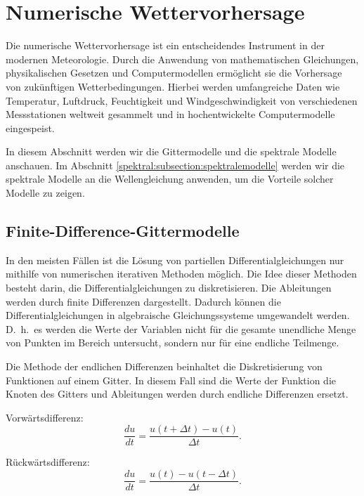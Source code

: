%
%
%
%
\section{Numerische Wettervorhersage
\label{spektral:section:nwp}}
Die numerische Wettervorhersage ist ein entscheidendes Instrument in der modernen Meteorologie. Durch die Anwendung von mathematischen Gleichungen, physikalischen Gesetzen und Computermodellen ermöglicht sie die Vorhersage von zukünftigen Wetterbedingungen. Hierbei werden umfangreiche Daten wie Temperatur, Luftdruck, Feuchtigkeit und Windgeschwindigkeit von verschiedenen Messstationen weltweit gesammelt und in hochentwickelte Computermodelle eingespeist.

In diesem Abschnitt werden wir die Gittermodelle und die spektrale
Modelle anschauen.
Im Abschnitt \ref{spektral:subsection:spektralemodelle}
werden wir die spektrale Modelle an die Wellengleichung anwenden,
um die Vorteile solcher Modelle zu zeigen.

\subsection{Finite-Difference-Gittermodelle
\label{spektral:subsection:gittermodelle}}
In den meisten Fällen ist die Lösung von partiellen Differentialgleichungen nur mithilfe von numerischen iterativen Methoden möglich. 
Die Idee dieser Methoden besteht darin, die Differentialgleichungen zu diskretisieren.
Die Ableitungen werden durch finite Differenzen dargestellt.
Dadurch können die Differentialgleichungen in algebraische Gleichungssysteme umgewandelt werden.
D.~h.~es werden die Werte der Variablen nicht für die gesamte
unendliche Menge von Punkten im Bereich untersucht, sondern nur für
eine endliche Teilmenge.

Die Methode der endlichen Differenzen beinhaltet die Diskretisierung von Funktionen auf einem Gitter.
In diesem Fall sind die Werte der Funktion die Knoten des Gitters und Ableitungen werden durch endliche Differenzen ersetzt.

Vorwärtsdifferenz:
\begin{equation}
\frac{du}{dt} = \frac{u(t + \Delta{t}) - u(t)}{\Delta{t}}.
\label{spektral:equation1}
\end{equation}

Rückwärtsdifferenz:
\begin{equation}
\frac{du}{dt} = \frac{u(t) - u(t - \Delta{t})}{\Delta{t}}.
\label{spektral:equation2}
\end{equation}

